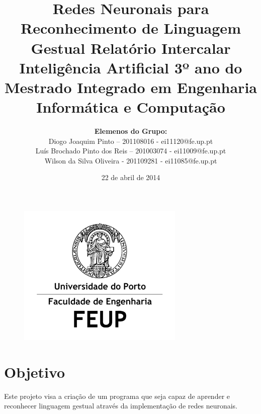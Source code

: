 \documentclass[10pt,a4paper]{article}
\begin{document}
\begin{figure}
\centering
\includegraphics[width=0.7\linewidth]{./LogoFeup}
\end{figure}

\title{\Huge\textbf{Redes Neuronais para Reconhecimento de Linguagem Gestual}\linebreak\linebreak\linebreak
\Large\textbf{Relatório Intercalar}\linebreak\linebreak
\Large{Inteligência Artificial}\linebreak
\Large{3º ano do Mestrado Integrado em Engenharia Informática e Computação} \linebreak \linebreak}

\author{\textbf{Elemenos do Grupo:}\\ Diogo Joaquim Pinto – 201108016 - ei11120@fe.up.pt \\ Luís Brochado Pinto dos Reis – 201003074 - ei11009@fe.up.pt \\ Wilson da Silva Oliveira - 201109281 - ei11085@fe.up.pt}
\date{22 de abril de 2014}
\maketitle

\tableofcontents
\newpage
\section{Objetivo}
\subitem

Este projeto visa a criação de um programa que seja capaz de aprender e reconhecer linguagem gestual através da implementação de redes neuronais.
\end{document}
